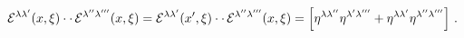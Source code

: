 \begin{equation}
{\cal E}^{\lambda\lambda'}(x,\xi) \cdot \cdot \,{\cal
E}^{\lambda''\lambda'''}(x,\xi) ={\cal
E}^{\lambda\lambda'}(x',\xi) \cdot \cdot \, {\cal
E}^{\lambda''\lambda'''}(x,\xi)=\left[\eta^{\lambda\lambda''}\eta^{\lambda'\lambda'''}
+\eta^{\lambda\lambda'}\eta^{\lambda''\lambda'''}\right]\,.
\end{equation}

